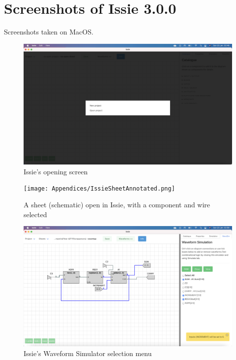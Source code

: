 \chapter{Screenshots of Issie 3.0.0} \label{app:screenshots}
Screenshots taken on MacOS.

\begin{figure} [h]
    \centering
    \includegraphics[width=\textwidth]{Appendices/IssieOpening.png}
    \caption{Issie's opening screen}
    \label{fig:IssieOpen}
\end{figure}

\begin{figure} [h]
    \centering
    \texttt{[image: Appendices/IssieSheetAnnotated.png]}
    \caption{A sheet (schematic) open in Issie, with a component and wire selected}
    \label{fig:IssieSheetAnnotated}
\end{figure}

\begin{figure} [h]
    \centering
    \includegraphics[width=\textwidth]{Appendices/IssieWaveSimSel.png}
    \caption{Issie's Waveform Simulator selection menu}
    \label{fig:IssieWSSel}
\end{figure}

